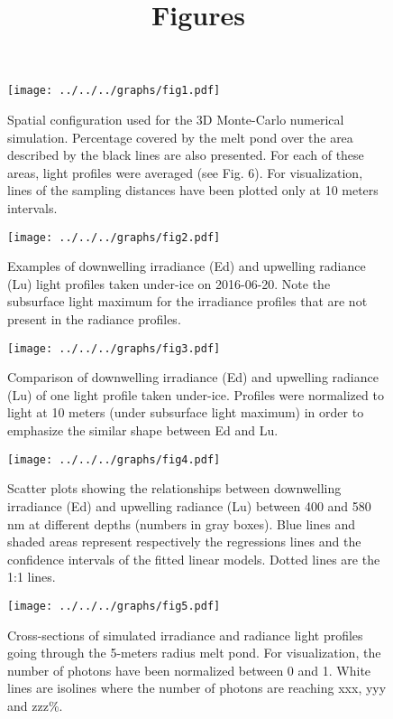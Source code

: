 \documentclass[12pt,a4paper]{scrartcl}
\title{Figures}
\date{}
\begin{document}
\maketitle

\begin{figure}[ht]
	\centering
	\texttt{[image: ../../../graphs/fig1.pdf]}
	\caption{Spatial configuration used for the 3D Monte-Carlo numerical simulation. Percentage covered by the melt pond over the area described by the black lines are also presented. For each of these areas, light profiles were averaged (see Fig. 6). For visualization, lines of the sampling distances have been plotted only at 10 meters intervals.}
\end{figure}

\clearpage
\newpage

\begin{figure}[ht]
	\centering
	\texttt{[image: ../../../graphs/fig2.pdf]}
	\caption{Examples of downwelling irradiance (Ed) and upwelling radiance (Lu) light profiles taken under-ice on 2016-06-20. Note the subsurface light maximum for the irradiance profiles that are not present in the radiance profiles.}
\end{figure}

\clearpage
\newpage

\begin{figure}[ht]
	\centering
	\texttt{[image: ../../../graphs/fig3.pdf]}
	\caption{Comparison of downwelling irradiance (Ed) and upwelling radiance (Lu) of one light profile taken under-ice. Profiles were normalized to light at 10 meters (under subsurface light maximum) in order to emphasize the similar shape between Ed and Lu.}
\end{figure}

\clearpage
\newpage

\begin{figure}[ht]
	\centering
	\texttt{[image: ../../../graphs/fig4.pdf]}
	\caption{Scatter plots showing the relationships between downwelling irradiance (Ed) and upwelling radiance (Lu) between 400 and 580 nm at different depths (numbers in gray boxes). Blue lines and shaded areas represent respectively the regressions lines and the confidence intervals of the fitted linear models. Dotted lines are the 1:1 lines.}
\end{figure}

\clearpage
\newpage

\begin{figure}[ht]
	\centering
	\texttt{[image: ../../../graphs/fig5.pdf]}
	\caption{Cross-sections of simulated irradiance and radiance light profiles going through the 5-meters radius melt pond. For visualization, the number of photons have been normalized between 0 and 1. White lines are isolines where the number of photons are reaching xxx, yyy and zzz\%.}
\end{figure}
\end{document}
